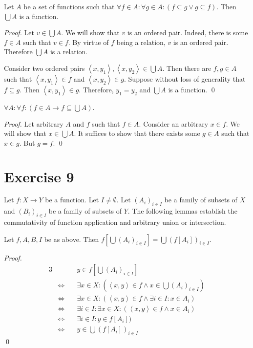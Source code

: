 \documentclass[11pt]{llncs}
\begin{document}
\begin{lemma}
  Let $A$ be a set of functions such that
  $\forall f \in A: \forall g \in A: (f \subseteq g \lor g \subseteq f)$.
  Then $\bigcup A$ is a function.
\end{lemma}
\begin{proof}
  Let $v \in \bigcup A$. We will show that $v$ is an ordered pair. Indeed,
  there is some $f \in A$ such that $v \in f$. By virtue of $f$ being a
  relation, $v$ is an ordered pair. Therefore $\bigcup A$ is a relation.

  Consider two ordered pairs
  $\left<x, y_1\right>, \left<x, y_2\right> \in \bigcup A$. Then there are
  $f, g \in A$ such that $\left<x, y_1\right> \in f$ and
  $\left<x, y_2\right> \in g$. Suppose without loss of generality that
  $f \subseteq g$. Then $\left<x, y_1\right> \in g$. Therefore, $y_1 = y_2$ and
  $\bigcup A$ is a function.
  \qed
\end{proof}

\begin{lemma}
  $\forall A: \forall f: (f \in A \rightarrow f \subseteq \bigcup A)$.
\end{lemma}
\begin{proof}
  Let arbitrary $A$ and $f$ such that $f \in A$. Consider an arbitrary
  $x \in f$. We will show that $x \in \bigcup A$. It suffices to show that there
  exists some $g \in A$ such that $x \in g$. But $g = f$.
  \qed
\end{proof}

\section*{Exercise 9}

Let $f: X \longrightarrow Y$ be a function. Let $I \neq \emptyset$. Let
$(A_i)_{i \in I}$ be a family of subsets of $X$ and $(B_i)_{i \in I}$ be a
family of subsets of $Y$. The following lemmas establish the commutativity of
function application and arbitrary union or intersection.

\begin{lemma}
  Let $f, A, B, I$ be as above. Then
  $f[\bigcup (A_i)_{i \in I}] = \bigcup (f[A_i])_{i \in I}$.
\end{lemma}
\begin{proof}
  \begin{alignat*}{3}
                         && y \in f[\bigcup (A_i)_{i \in I}]\\
     &\Leftrightarrow\quad & \exists x \in X: (\left<x, y\right> \in f \land x \in \bigcup (A_i)_{i \in I})\\
     &\Leftrightarrow\quad & \exists x \in X: (\left<x, y\right> \in f \land \exists i \in I: x \in A_i)\\
     &\Leftrightarrow\quad & \exists i \in I: \exists x \in X: (\left<x, y\right> \in f \land x \in A_i)\\
     &\Leftrightarrow\quad & \exists i \in I: y \in f[A_i])\\
     &\Leftrightarrow\quad & y \in \bigcup (f[A_i])_{i \in I}
  \end{alignat*}
  \qed
\end{proof}
\end{document}
